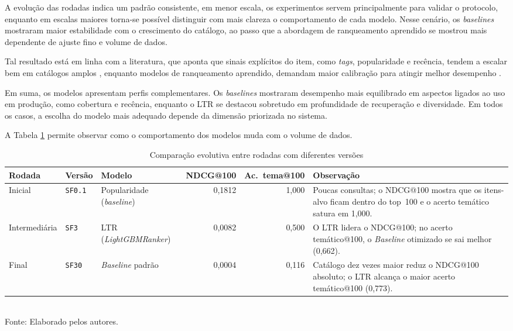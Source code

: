 \documentclass[a4paper,12pt]{article}
\begin{document}
{A evolução das rodadas indica um padrão consistente, em menor escala, os experimentos servem principalmente para validar o protocolo, enquanto em escalas maiores torna-se possível distinguir com mais clareza o comportamento de cada modelo. Nesse cenário, os \textit{baselines} mostraram maior estabilidade com o crescimento do catálogo, ao passo que a abordagem de ranqueamento aprendido se mostrou mais dependente de ajuste fino e volume de dados. 

Tal resultado está em linha com a literatura, que aponta que sinais explícitos do item, como \textit{tags}, popularidade e recência, tendem a escalar bem em catálogos amplos \cite{Lops2011CB}, enquanto modelos de ranqueamento aprendido, demandam maior calibração para atingir melhor desempenho \cite{Ke2017LightGBM,Burges2010LTROverview}.

Em suma, os modelos apresentam perfis complementares. Os \textit{baselines} mostraram desempenho mais equilibrado em aspectos ligados ao uso em produção, como cobertura e recência, enquanto o LTR se destacou sobretudo em profundidade de recuperação e diversidade. Em todos os casos, a escolha do modelo mais adequado depende da dimensão priorizada no sistema.

A Tabela \ref{tab:comparacao_snapshots_tcc} permite observar como o comportamento dos modelos muda com o volume de dados.

\begin{table}[H]
\centering
\caption{Comparação evolutiva entre rodadas com diferentes versões}
\label{tab:comparacao_snapshots_tcc}
\small
\begin{tabular}{|l|l|p{2.8cm}|r|r|p{3.6cm}|}
\hline
\textbf{Rodada} & \textbf{Versão} & \textbf{Modelo} & \textbf{NDCG@100} & \textbf{Ac.\ tema@100} & \textbf{Observação} \\
\hline
Inicial & \texttt{SF0.1} & Popularidade (\textit{baseline}) & 0,1812 & 1,000 & Poucas consultas; o NDCG@100 mostra que os itens-alvo ficam dentro do top~100 e o acerto temático satura em 1,000. \\
\hline
Intermediária & \texttt{SF3} & LTR (\textit{LightGBMRanker}) & 0,0082 & 0,500 & O LTR lidera o NDCG@100; no acerto temático@100, o \textit{Baseline} otimizado se sai melhor (0,662). \\
\hline
Final & \texttt{SF30} & \textit{Baseline} padrão & 0,0004 & 0,116 & Catálogo dez vezes maior reduz o NDCG@100 absoluto; o LTR alcança o maior acerto temático@100 (0,773). \\
\hline
\end{tabular}
\small \\ Fonte: Elaborado pelos autores.
\end{table}

}
\end{document}
